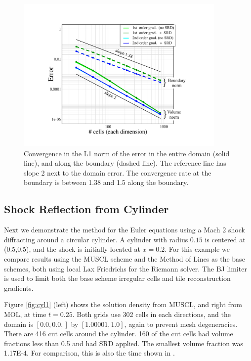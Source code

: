 \begin{figure}[t]
	\begin{center}
		\includegraphics[height=3.0in]{figs/ssvconv.pdf}
		\caption{\sf Convergence in the L1 norm of the error in the entire 
			domain  (solid line), and along the boundary (dashed line).
			The reference line has slope 2 next to the domain error. The convergence
			rate at the boundary is between 1.38 and 1.5
			along the boundary.
			\label{fig:ssv}}
	\end{center}
\end{figure}



\subsection{Shock Reflection from  Cylinder}
Next we demonstrate the method for the Euler equations using a Mach 2
shock diffracting around a circular cylinder. A cylinder with radius $0.15$ is centered at
(0.5,0.5), and the shock is initially located at $x = 0.2$.
For this example we compare results using the MUSCL scheme and
the Method of Lines as the base schemes, both using local Lax Friedrichs for the Riemann
solver. The BJ limiter is used to limit
both the base scheme irregular cells  and tile reconstruction gradients. 

Figure \ref{fig:cyl1} (left) shows the solution density from MUSCL, and
right from MOL, at time $t=0.25$. 
Both grids use 302 cells in each
directions, and the domain is  $[0.0,0.0,]$ by  $[1.00001, 1.0]$, again to
prevent mesh degeneracies.
There are 416 cut cells
around the cylinder. 160 of the cut cells had volume fractions less than
0.5 and had SRD applied.  The smallest volume fraction was 1.17E-4.   
For comparison, this is also the time shown in \cite{mjb-hel-rjl:hbox2}. 

